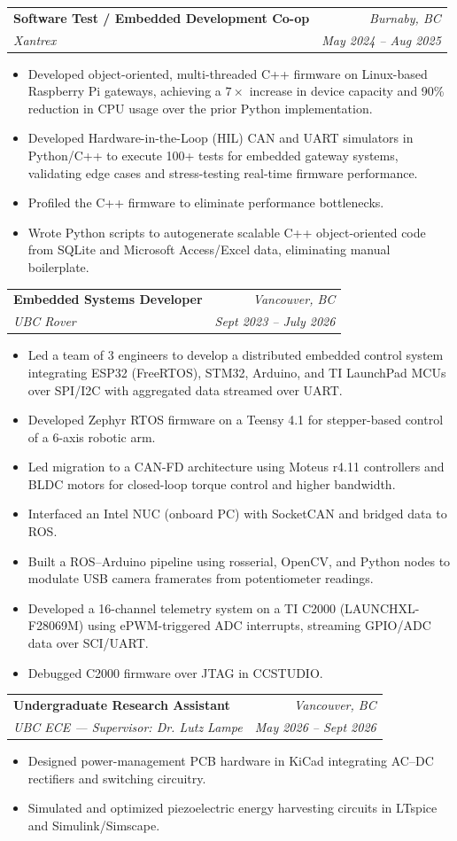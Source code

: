 \documentclass[letterpaper,11pt]{article}
\makeatletter
\newcommand{\resumeItem}[1]{
  \item\small{
    {#1 \vspace{-2pt}}
  }
}
\newcommand{\resumeSubheading}[4]{
  \vspace{-2pt}\item
    \begin{tabular*}{0.97\textwidth}[t]{l@{\extracolsep{\fill}}r}
      \textbf{#1} & \textit{\small #4} \\
      \textit{\small#3} & \textit{\small #2} \\
    \end{tabular*}\vspace{-7pt}
}
\newcommand{\resumeItemListStart}{\begin{itemize}[leftmargin=0.2in]}
\newcommand{\resumeItemListEnd}{\end{itemize}\vspace{-5pt}}
\makeatother
\begin{document}
    \resumeSubheading
      {Software Test / Embedded Development Co-op}{May 2024 -- Aug 2025}
      {Xantrex}{Burnaby, BC}
      \resumeItemListStart
        \resumeItem{Developed object-oriented, multi-threaded C++ firmware on Linux-based Raspberry Pi gateways, achieving a $7\times$ increase in device capacity and 90\% reduction in CPU usage over the prior Python implementation.}
        \resumeItem{Developed Hardware-in-the-Loop (HIL) CAN and UART simulators in Python/C++ to execute 100+ tests for embedded gateway systems, validating edge cases and stress-testing real-time firmware performance.}
        \resumeItem{Profiled the C++ firmware to eliminate performance bottlenecks.}
        \resumeItem{Wrote Python scripts to autogenerate scalable C++ object-oriented code from SQLite and Microsoft Access/Excel data, eliminating manual boilerplate.}
      \resumeItemListEnd

\resumeSubheading
      {Embedded Systems Developer}{Sept 2023 -- July 2026}
      {UBC Rover}{Vancouver, BC}
      \resumeItemListStart
        \resumeItem{Led a team of 3 engineers to develop a distributed embedded control system integrating ESP32 (FreeRTOS), STM32, Arduino, and TI LaunchPad MCUs over SPI/I2C with aggregated data streamed over UART.}
        \resumeItem{Developed Zephyr RTOS firmware on a Teensy 4.1 for stepper-based control of a 6-axis robotic arm.}
        \resumeItem{Led migration to a CAN-FD architecture using Moteus r4.11 controllers and BLDC motors for closed-loop torque control and higher bandwidth.}
        \resumeItem{Interfaced an Intel NUC (onboard PC) with SocketCAN and bridged data to ROS.}
        \resumeItem{Built a ROS--Arduino pipeline using rosserial, OpenCV, and Python nodes to modulate USB camera framerates from potentiometer readings.}
        \resumeItem{Developed a 16-channel telemetry system on a TI C2000 (LAUNCHXL-F28069M) using ePWM-triggered ADC interrupts, streaming GPIO/ADC data over SCI/UART.}
        \resumeItem{Debugged C2000 firmware over JTAG in CCSTUDIO.}
      \resumeItemListEnd

    \resumeSubheading
      {Undergraduate Research Assistant}{May 2026 -- Sept 2026}
      {UBC ECE --- Supervisor: Dr. Lutz Lampe}{Vancouver, BC}
      \resumeItemListStart
        \resumeItem{Designed power-management PCB hardware in KiCad integrating AC--DC rectifiers and switching circuitry.}
        \resumeItem{Simulated and optimized piezoelectric energy harvesting circuits in LTspice and Simulink/Simscape.}
      \resumeItemListEnd
\end{document}
